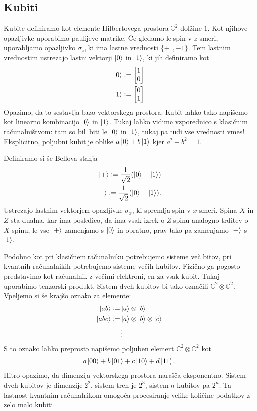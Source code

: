 \documentclass[mat1]{fmfdelo}
\newcommand{\defeq}{\vcentcolon=}
\begin{document}
\subsection{Kubiti}
Kubite definiramo kot elemente Hilbertovega prostora \(\mathbb C^2\) dolžine \(1\). Kot njihove opazljivke uporabimo paulijeve matrike. Če gledamo le spin v \(z\) smeri, uporabljamo opazljivko \(\sigma_z\), ki ima lastne vrednosti \(\{+1, -1\}\). Tem lastnim vrednostim ustrezajo lastni vektorji \(\ket0\) in \(\ket1\), ki jih definiramo kot
\begin{align*}
    \ket0 \defeq \begin{bmatrix}
        1\\0
    \end{bmatrix}\\
    \ket1 \defeq \begin{bmatrix}
        0\\1
    \end{bmatrix}
\end{align*}
Opazimo, da to sestavlja bazo vektorskega prostora. Kubit lahko tako napišemo kot linearno kombinacijo \(\ket0\) in \(\ket1\). Tukaj lahko vidimo vzporednico s klasičnim računalništvom: tam so bili biti le \(\ket0\) in \(\ket1\), tukaj pa tudi vse vrednosti vmes! Eksplicitno, poljubni kubit je oblike \(a\ket0+b\ket1\) kjer \(a^2+b^2=1\).

Definiramo si še Bellova stanja
\begin{align*}
    \ket{+} \defeq \frac{1}{\sqrt2} (\ket0+\ket1)\\
    \ket{-} \defeq \frac{1}{\sqrt2} (\ket0-\ket1).
\end{align*}
Ustrezajo lastnim vektorjem opazljivke \(\sigma_x\), ki spremlja spin v \(x\) smeri. Spina \(X\) in \(Z\) sta dualna, kar ima posledico, da ima vsak izrek o \(Z\) spinu analogno trditev o \(X\) spinu, le vse \(\ket+\) zamenjamo s \(\ket0\) in obratno, prav tako pa zamenjamo \(\ket-\) s \(\ket1\).

Podobno kot pri klasičnem računalniku potrebujemo sisteme več bitov, pri kvantnih računalnikih potrebujemo sisteme večih kubitov. Fizično ga pogosto predstavimo kot računalnik z večimi elektroni, en za vsak kubit. Tukaj uporabimo tenzorski produkt. Sistem dveh kubitov bi tako označili \(\mathbb C^2 \otimes \mathbb C^2\). Vpeljemo si še krajšo oznako za elemente:
\begin{align*}
    \ket{ab} \defeq& \ket{a}\otimes\ket{b}\\
    \ket{abc} \defeq& \ket{a}\otimes\ket{b}\otimes\ket{c}\\
    &\vdots
\end{align*}
S to oznako lahko preprosto napišemo poljuben element \(\mathbb C^2 \otimes \mathbb C^2\) kot
\begin{align*}
    a\ket{00} + b\ket{01} + c\ket{10} + d\ket{11}.
\end{align*}
Hitro opazimo, da dimenzija vektorskega prostora narašča eksponentno. Sistem dveh kubitov je dimenzije \(2^2\), sistem treh je \(2^3\), sistem \(n\) kubitov pa \(2^n\). Ta lastnost kvantnim računalnikom omogoča procesiranje velike količine podatkov z zelo malo kubiti.
\end{document}
